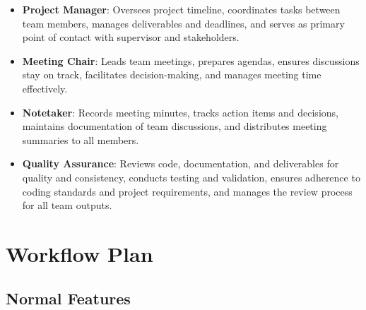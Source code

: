 \documentclass{article}
\begin{document}
\begin{itemize}
  \item \textbf{Project Manager}: Oversees project timeline, coordinates tasks between team members, manages deliverables and deadlines, and serves as primary point of contact with supervisor and stakeholders.
  \item \textbf{Meeting Chair}: Leads team meetings, prepares agendas, ensures discussions stay on track, facilitates decision-making, and manages meeting time effectively.
  \item \textbf{Notetaker}: Records meeting minutes, tracks action items and decisions, maintains documentation of team discussions, and distributes meeting summaries to all members.
  \item \textbf{Quality Assurance}: Reviews code, documentation, and deliverables for quality and consistency, conducts testing and validation, ensures adherence to coding standards and project requirements, and manages the review process for all team outputs.
\end{itemize}

\section{Workflow Plan}

\subsection{Normal Features}
\end{document}
